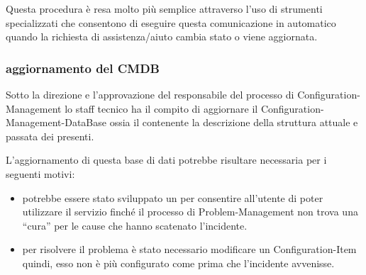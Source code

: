 Questa procedura è resa molto più semplice attraverso l'uso di strumenti  specializzati che consentono di eseguire questa comunicazione in automatico quando la richiesta di assistenza/aiuto cambia stato o viene aggiornata.

\subsubsection[Aggiornamento del CMDB]{aggiornamento del CMDB}
Sotto la direzione e l'approvazione del responsabile del processo di \ac{Configuration-Management} lo staff tecnico ha il compito di aggiornare il \ac{Configuration-Management-DataBase} ossia il  contenente la descrizione della struttura attuale e passata dei  presenti.

L'aggiornamento di questa base di dati potrebbe risultare necessaria per i seguenti motivi:

\begin{itemize}
\item{potrebbe essere stato sviluppato un  per consentire all'utente di poter utilizzare il servizio finché il processo di \ac{Problem-Management} non trova una ``cura'' per le cause che hanno scatenato l'incidente.}
\item{per risolvere il problema è stato necessario modificare un \ac{Configuration-Item} quindi, esso non è più configurato come prima che l'incidente avvenisse.}
\end{itemize}